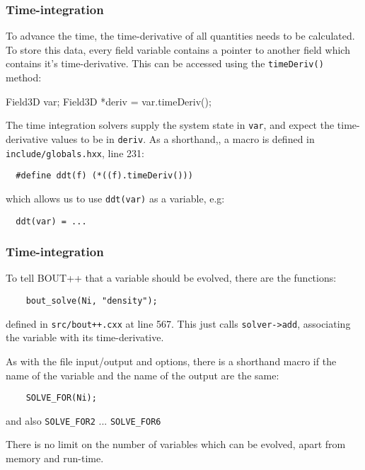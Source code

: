\documentclass{beamer}
\begin{document}
\begin{frame}[fragile]
  \frametitle{Time-integration}
  
  To advance the time, the time-derivative of all quantities needs to be
  calculated. To store this data, every field variable contains a pointer to
  another field which contains it's time-derivative. This can be accessed using the \texttt{timeDeriv()} method:
  
  \begin{semiverbatim}
    Field3D var;
    Field3D *deriv = var.timeDeriv();
  \end{semiverbatim}
  \vspace{-0.5cm}
  
  The time integration solvers supply the system state in \texttt{var},
  and expect the time-derivative values to be in \texttt{deriv}. As a shorthand,, a macro is defined in \texttt{include/globals.hxx}, line 231:

  \begin{verbatim}
  #define ddt(f) (*((f).timeDeriv()))
  \end{verbatim}
  \vspace{-0.5cm}
  which allows us to use \texttt{ddt(var)} as a variable, e.g:
  \begin{verbatim}
  ddt(var) = ...
  \end{verbatim}
\end{frame}

\begin{frame}[fragile]
  \frametitle{Time-integration}
  
  To tell BOUT++ that a variable should be evolved,
  there are the functions:
  \begin{verbatim}
    bout_solve(Ni, "density");
  \end{verbatim}
  \vspace{-0.5cm}
  defined in \texttt{src/bout++.cxx} at line 567. This just calls
  \texttt{solver->add}, associating the variable with its time-derivative.

  As with the file input/output and options, there is a shorthand macro if
  the name of the variable and the name of the output are the same:
  \begin{verbatim}
    SOLVE_FOR(Ni);
  \end{verbatim}
  \vspace{-0.5cm}
  and also \texttt{SOLVE\_FOR2} ... \texttt{SOLVE\_FOR6}

  There is no limit on the number of variables which can be evolved,
  apart from memory and run-time.
\end{frame}
\end{document}

